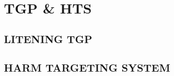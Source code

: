 \chapter{TGP \& HTS}
\minitoc
\cleardoublepage

\section{LITENING TGP}

\clearpage 

\section{HARM TARGETING SYSTEM}

\cleardoublepage